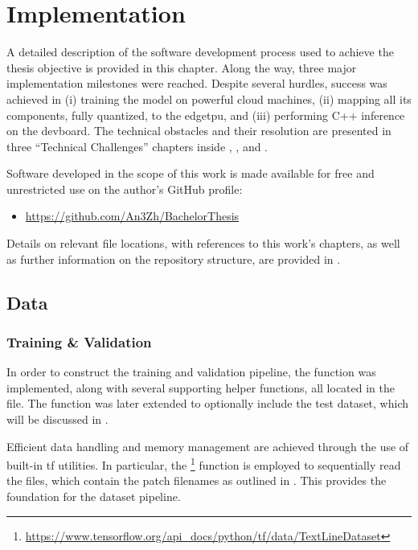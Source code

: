 {

\setlength{\parindent}{0pt}
\setlength{\parskip}{1em}

\chapter{Implementation}
\label{chapter:implementation}

A detailed description of the software development process used to achieve the thesis objective is provided in this chapter.
Along the way, three major implementation milestones were reached. Despite several hurdles, success was achieved in
(i) training the model on powerful cloud machines, (ii) mapping all its components, fully quantized, to the \gls{edgetpu},
and (iii) performing C++ inference on the \gls{devboard}.
The technical obstacles and their resolution are presented in three “Technical Challenges” chapters inside
, , and .

Software developed in the scope of this work
is made available for free and unrestricted use on the author's GitHub profile:
\begin{itemize}
  \item \url{https://github.com/An3Zh/BachelorThesis}
\end{itemize}

Details on relevant file locations, with references to this work's chapters,
as well as further information on the repository structure, are provided in .

\section{Data}
\label{sec:data}

\subsection{Training \& Validation}

In order to construct the training and validation pipeline, the function  was implemented, along with several supporting helper functions, all located in the  file.
The function was later extended to optionally include the test dataset, which will be discussed in .

Efficient data handling and memory management are achieved through the use of built-in \gls{tf} utilities.
In particular, the \footnote{\url{https://www.tensorflow.org/api_docs/python/tf/data/TextLineDataset}} function
is employed to sequentially read the  files,
which contain the patch filenames as outlined in .
This provides the foundation for the dataset pipeline.

}
